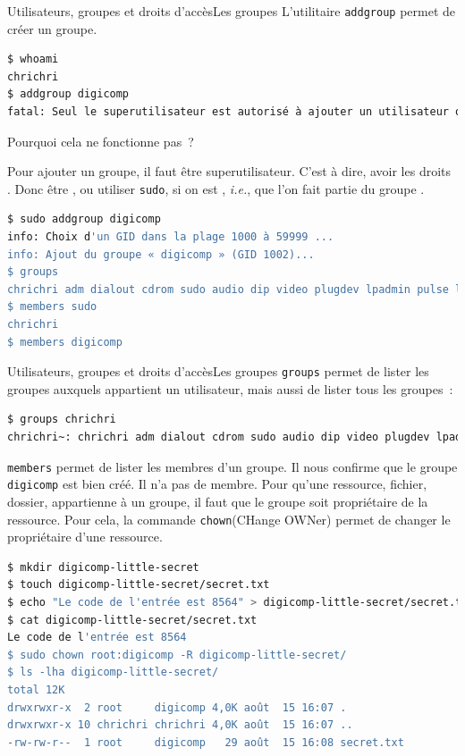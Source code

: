 \documentclass{beamer}
\begin{document}
    \begin{frame}[fragile]{Utilisateurs, groupes et droits d'accès}{Les groupes}
        L'utilitaire \lstinline{addgroup} permet de créer un groupe.
        \begin{lstlisting}[language=bash]
$ whoami
chrichri
$ addgroup digicomp
fatal: Seul le superutilisateur est autorisé à ajouter un utilisateur ou un groupe au système.
        \end{lstlisting}
        Pourquoi cela ne fonctionne pas~?
        \pause
        \begin{dangercolorbox}
            Pour ajouter un groupe, il faut être superutilisateur.
            C'est à dire, avoir les droits .
            Donc être , ou utiliser \lstinline{sudo}, si on est , \textit{i.e.}, que l'on fait partie du groupe .
        \end{dangercolorbox}
        \begin{lstlisting}[language=bash]
$ sudo addgroup digicomp
info: Choix d'un GID dans la plage 1000 à 59999 ...
info: Ajout du groupe « digicomp » (GID 1002)...
$ groups
chrichri adm dialout cdrom sudo audio dip video plugdev lpadmin pulse lxd sambashare docker libvirt nordvpn
$ members sudo
chrichri
$ members digicomp
        \end{lstlisting}
    \end{frame}

    \begin{frame}[fragile]{Utilisateurs, groupes et droits d'accès}{Les groupes}
        \lstinline{groups} permet de lister les groupes auxquels appartient un utilisateur, mais aussi de lister tous les groupes~:
        \begin{lstlisting}[language=bash]
$ groups chrichri
chrichri~: chrichri adm dialout cdrom sudo audio dip video plugdev lpadmin pulse lxd sambashare nordvpn docker libvirt
        \end{lstlisting}
        \lstinline{members} permet de lister les membres d'un groupe.
        Il nous confirme que le groupe \lstinline{digicomp} est bien créé.
        Il n'a pas de membre.
        \bigbreak
        Pour qu'une ressource, fichier, dossier, appartienne à un groupe, il faut que le groupe soit propriétaire de la ressource.
        Pour cela, la commande \lstinline{chown}(CHange OWNer) permet de changer le propriétaire d'une ressource.
        \begin{lstlisting}[language=bash]
$ mkdir digicomp-little-secret
$ touch digicomp-little-secret/secret.txt
$ echo "Le code de l'entrée est 8564" > digicomp-little-secret/secret.txt
$ cat digicomp-little-secret/secret.txt
Le code de l'entrée est 8564
$ sudo chown root:digicomp -R digicomp-little-secret/
$ ls -lha digicomp-little-secret/
total 12K
drwxrwxr-x  2 root     digicomp 4,0K août  15 16:07 .
drwxrwxr-x 10 chrichri chrichri 4,0K août  15 16:07 ..
-rw-rw-r--  1 root     digicomp   29 août  15 16:08 secret.txt
        \end{lstlisting}
    \end{frame}
\end{document}
